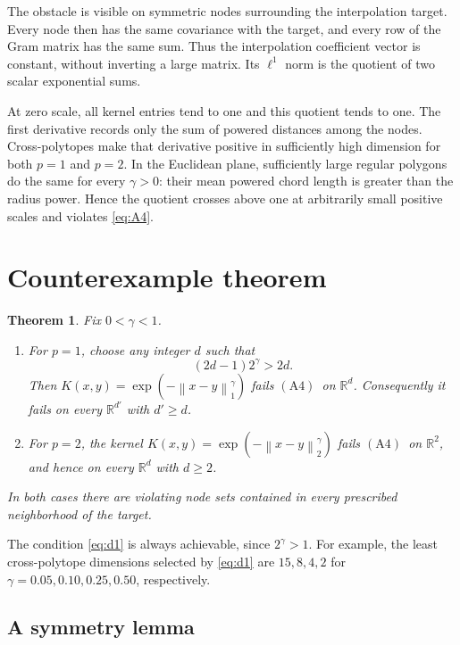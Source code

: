 \documentclass[11pt]{article}
\newtheorem{theorem}{Theorem}
\newcommand{\R}{\mathbb R}
\newcommand{\norm}[1]{\left\lVert #1\right\rVert}
\newcommand{\Afour}{\ensuremath{\mathrm{(A4)}}}
\begin{document}
The obstacle is visible on symmetric nodes surrounding the interpolation
target.  Every node then has the same covariance with the target, and every
row of the Gram matrix has the same sum.  Thus the interpolation coefficient
vector is constant, without inverting a large matrix.  Its $\ell^1$ norm is
the quotient of two scalar exponential sums.

At zero scale, all kernel entries tend to one and this quotient tends to one.
The first derivative records only the sum of powered distances among the
nodes.  Cross-polytopes make that derivative positive in sufficiently high
dimension for both $p=1$ and $p=2$.  In the Euclidean plane, sufficiently
large regular polygons do the same for every $\gamma>0$: their mean powered
chord length is greater than the radius power.  Hence the quotient crosses
above one at arbitrarily small positive scales and violates \eqref{eq:A4}.

\section{Counterexample theorem}

\begin{theorem}
\label{thm:main}
Fix $0<\gamma<1$.
\begin{enumerate}
\item For $p=1$, choose any integer $d$ such that
\begin{equation}
  (2d-1)2^\gamma>2d.
  \label{eq:d1}
\end{equation}
Then $K(x,y)=\exp(-\norm{x-y}_1^\gamma)$ fails \Afour\ on $\R^d$.
Consequently it fails on every $\R^{d'}$ with $d'\geq d$.
\item For $p=2$, the kernel
$K(x,y)=\exp(-\norm{x-y}_2^\gamma)$ fails \Afour\ on $\R^2$, and hence
on every $\R^d$ with $d\geq2$.
\end{enumerate}
In both cases there are violating node sets contained in every prescribed
neighborhood of the target.
\end{theorem}

The condition \eqref{eq:d1} is always achievable, since $2^\gamma>1$.
For example, the least cross-polytope dimensions selected by
\eqref{eq:d1} are $15,8,4,2$ for
$\gamma=0.05,0.10,0.25,0.50$, respectively.

\subsection{A symmetry lemma}
\end{document}
